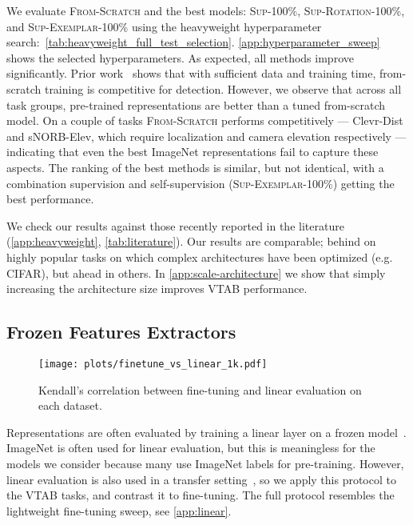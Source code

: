 \documentclass{article}
\newcommand{\imagenet}{ImageNet}
\begin{document}
We evaluate \textsc{From-Scratch} and the best models: \textsc{Sup-100\%}, \textsc{Sup-Rotation-100\%}, and \textsc{Sup-Exemplar-100\%} using the heavyweight hyperparameter search:~\cref{tab:heavyweight_full_test_selection}.
\cref{app:hyperparameter_sweep} shows the selected hyperparameters.
As expected, all methods improve significantly.
Prior work~\citep{he2018rethinking} shows that with sufficient data and training time, from-scratch training is competitive for detection.
However, we observe that across all task groups, pre-trained representations are better than a tuned from-scratch model.
On a couple of tasks \textsc{From-Scratch} performs competitively --- Clevr-Dist and sNORB-Elev, which require localization and camera elevation respectively --- indicating that even the best \imagenet{} representations fail to capture these aspects.
The ranking of the best methods is similar, but not identical, with a combination supervision and self-supervision (\textsc{Sup-Exemplar-100\%}) getting the best performance.

We check our results against those recently reported in the literature (\cref{app:heavyweight}, \cref{tab:literature}).
Our results are comparable; behind on highly popular tasks on which complex architectures have been optimized (e.g. CIFAR), but ahead in others.
In \cref{app:scale-architecture} we show that simply increasing the architecture size improves VTAB performance.

\subsection{Frozen Features Extractors\label{sec:linear}}

\begin{figure}
\centering
\texttt{[image: plots/finetune\_vs\_linear\_1k.pdf]}
\vspace{-5pt}
\caption{Kendall's correlation between fine-tuning and linear evaluation on each dataset.}
\label{fig:finetune_vs_linear}
\end{figure}

Representations are often evaluated by training a linear layer on a frozen model~\citep{kolesnikov2019revisiting}.
\imagenet{} is often used for linear evaluation, but this is meaningless for the models we consider because many use \imagenet{} labels for pre-training.
However, linear evaluation is also used in a transfer setting~\citep{goyal2019scaling}, so we apply this protocol to the VTAB tasks, and contrast it to fine-tuning.
The full protocol resembles the lightweight fine-tuning sweep, see \cref{app:linear}.
\end{document}
